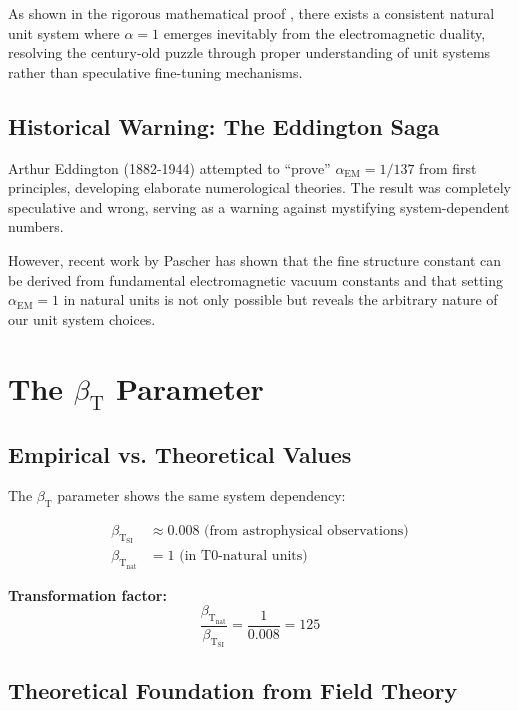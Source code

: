 \documentclass[12pt,a4paper]{article}
\newcommand{\alphaEM}{\alpha_{\text{EM}}}
\newcommand{\betaT}{\beta_{\text{T}}}
\begin{document}
	As shown in the rigorous mathematical proof \cite{pascher_proof_2025}, there exists a consistent natural unit system where $\alpha = 1$ emerges inevitably from the electromagnetic duality, resolving the century-old puzzle through proper understanding of unit systems rather than speculative fine-tuning mechanisms.
	
	\subsection{Historical Warning: The Eddington Saga}
	\label{subsec:eddington_warning}
	
	Arthur Eddington (1882-1944) attempted to ``prove'' $\alphaEM = 1/137$ from first principles, developing elaborate numerological theories. The result was completely speculative and wrong, serving as a warning against mystifying system-dependent numbers.
	
	However, recent work by Pascher \cite{pascher_feinstruktur_2025} has shown that the fine structure constant can be derived from fundamental electromagnetic vacuum constants and that setting $\alphaEM = 1$ in natural units is not only possible but reveals the arbitrary nature of our unit system choices.
	
	\section{The $\betaT$ Parameter}
	\label{sec:beta_t}
	
	\subsection{Empirical vs. Theoretical Values}
	\label{subsec:beta_empirical_theoretical}
	
	The $\betaT$ parameter shows the same system dependency:
	
	\begin{align}
		\betaT_{\text{SI}} &\approx 0.008 \text{ (from astrophysical observations)} \\
		\betaT_{\text{nat}} &= 1 \text{ (in T0-natural units)}
	\end{align}
	
	\textbf{Transformation factor:}
	$$\frac{\betaT_{\text{nat}}}{\betaT_{\text{SI}}} = \frac{1}{0.008} = 125$$
	
	\subsection{Theoretical Foundation from Field Theory}
	\label{subsec:beta_field_theory}
	
\end{document}

